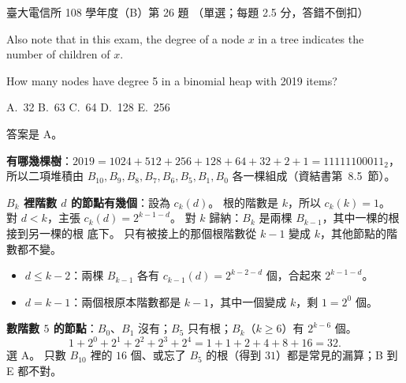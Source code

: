 \begin{pastexam}[label={px:ntu-108-comm-dsab-26}]{臺大電信所 108 學年度（B）第 26 題}
（單選；每題 2.5 分，答錯不倒扣）

Also note that in this exam, the degree of a node $x$ in a tree indicates the number of children
of $x$.

How many nodes have degree 5 in a binomial heap with 2019 items?

A.~32 \qquad B.~63 \qquad C.~64 \qquad D.~128 \qquad E.~256
\end{pastexam}

\begin{pastsoln}
答案是 A。

\textbf{有哪幾棵樹}：$2019 = 1024 + 512 + 256 + 128 + 64 + 32 + 2 + 1 = 11111100011_2$，所以二項堆積由
$B_{10}, B_9, B_8, B_7, B_6, B_5, B_1, B_0$ 各一棵組成（資結書第~8.5~節）。

\textbf{$B_k$ 裡階數 $d$ 的節點有幾個}：設為 $c_k(d)$。 根的階數是 $k$，所以 $c_k(k) = 1$。 對
$d < k$，主張 $c_k(d) = 2^{k-1-d}$。 對 $k$ 歸納：$B_k$ 是兩棵 $B_{k-1}$，其中一棵的根接到另一棵的根
底下。 只有被接上的那個根階數從 $k - 1$ 變成 $k$，其他節點的階數都不變。
\begin{itemize}
\item $d \le k - 2$：兩棵 $B_{k-1}$ 各有 $c_{k-1}(d) = 2^{k-2-d}$ 個，合起來 $2^{k-1-d}$。
\item $d = k - 1$：兩個根原本階數都是 $k - 1$，其中一個變成 $k$，剩 $1 = 2^0$ 個。
\end{itemize}

\textbf{數階數 $5$ 的節點}：$B_0$、$B_1$ 沒有；$B_5$ 只有根；$B_k$（$k \ge 6$）有 $2^{k-6}$ 個。
\[
1 + 2^0 + 2^1 + 2^2 + 2^3 + 2^4 = 1 + 1 + 2 + 4 + 8 + 16 = 32.
\]
選 A。 只數 $B_{10}$ 裡的 $16$ 個、或忘了 $B_5$ 的根（得到 $31$）都是常見的漏算；B 到 E 都不對。
\end{pastsoln}
